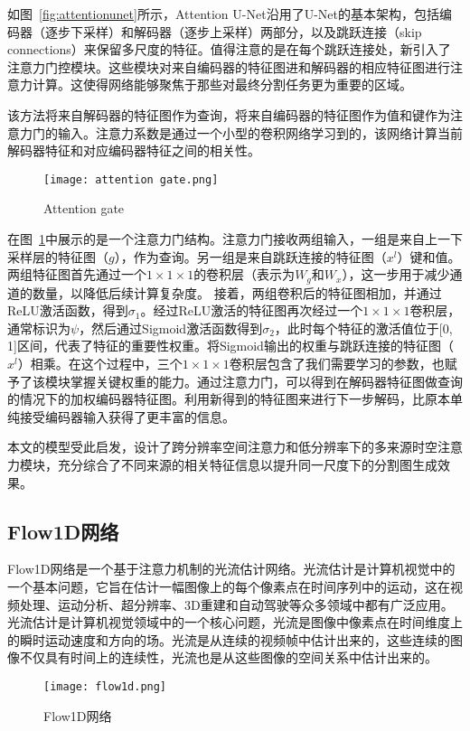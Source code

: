 如图~\ref{fig:attentionunet}所示，Attention U-Net沿用了U-Net的基本架构，包括编码器（逐步下采样）和解码器（逐步上采样）两部分，以及跳跃连接（skip connections）来保留多尺度的特征。值得注意的是在每个跳跃连接处，新引入了注意力门控模块。这些模块对来自编码器的特征图进和解码器的相应特征图进行注意力计算。这使得网络能够聚焦于那些对最终分割任务更为重要的区域。

该方法将来自解码器的特征图作为查询，将来自编码器的特征图作为值和键作为注意力门的输入。注意力系数是通过一个小型的卷积网络学习到的，该网络计算当前解码器特征和对应编码器特征之间的相关性。
\begin{figure}[h]
  \centering
  \texttt{[image: attention gate.png]}
  \caption{Attention gate}
  \label{fig:attentiongate}
\end{figure}


在图~\ref{fig:attentiongate}中展示的是一个注意力门结构。注意力门接收两组输入，一组是来自上一下采样层的特征图（\(g\)），作为查询。另一组是来自跳跃连接的特征图（\(x^l\)）键和值。
两组特征图首先通过一个\(1 \times 1 \times 1\)的卷积层（表示为\(W_g\)和\(W_x\)），这一步用于减少通道的数量，以降低后续计算复杂度。
接着，两组卷积后的特征图相加，并通过ReLU激活函数，得到\( \sigma_1\)。经过ReLU激活的特征图再次经过一个\(1 \times 1 \times 1\)卷积层，通常标识为\(\psi\)，然后通过Sigmoid激活函数得到\( \sigma_2\)，此时每个特征的激活值位于[0, 1]区间，代表了特征的重要性权重。将Sigmoid输出的权重与跳跃连接的特征图（\(x^l\)）相乘。在这个过程中，三个\(1 \times 1 \times 1\)卷积层包含了我们需要学习的参数，也赋予了该模块掌握关键权重的能力。通过注意力门，可以得到在解码器特征图做查询的情况下的加权编码器特征图。利用新得到的特征图来进行下一步解码，比原本单纯接受编码器输入获得了更丰富的信息。

本文的模型受此启发，设计了跨分辨率空间注意力和低分辨率下的多来源时空注意力模块，充分综合了不同来源的相关特征信息以提升同一尺度下的分割图生成效果。

\subsection{Flow1D网络}
Flow1D\cite{2022ComparisonPoolingMethodsConvolutionalNeuralNetworks}网络是一个基于注意力机制的光流估计网络。光流估计是计算机视觉中的一个基本问题，它旨在估计一幅图像上的每个像素点在时间序列中的运动，这在视频处理、运动分析、超分辨率、3D重建和自动驾驶等众多领域中都有广泛应用。光流估计是计算机视觉领域中的一个核心问题，光流是图像中像素点在时间维度上的瞬时运动速度和方向的场。光流是从连续的视频帧中估计出来的，这些连续的图像不仅具有时间上的连续性，光流也是从这些图像的空间关系中估计出来的。
\begin{figure}[h]
  \centering
  \texttt{[image: flow1d.png]}
  \caption{Flow1D网络}
  \label{fig:Flow1D}
\end{figure}

